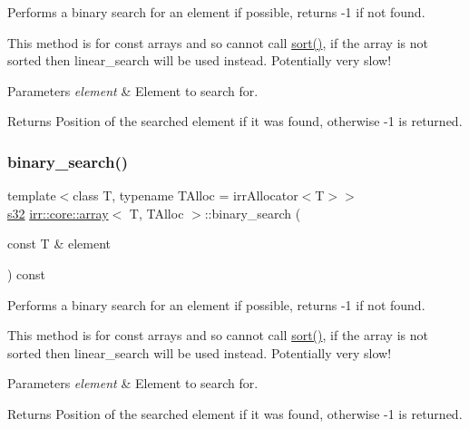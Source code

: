 Performs a binary search for an element if possible, returns -\/1 if not found. 

This method is for const arrays and so cannot call \hyperlink{classirr_1_1core_1_1array_a870e52dd57dd67a9d59e5ca5f82bca94}{sort()}, if the array is not sorted then linear\+\_\+search will be used instead. Potentially very slow! 
\begin{DoxyParams}{Parameters}
{\em element} & Element to search for. \\
\hline
\end{DoxyParams}
\begin{DoxyReturn}{Returns}
Position of the searched element if it was found, otherwise -\/1 is returned. 
\end{DoxyReturn}
\mbox{\label{classirr_1_1core_1_1array_aec40f807c683671067d52e83d7b72a82}} 
\subsubsection{\texorpdfstring{binary\+\_\+search()}{binary\_search()}\hspace{0.1cm}{\footnotesize\ttfamily [4/6]}}
{\footnotesize\ttfamily template$<$class T, typename T\+Alloc = irr\+Allocator$<$\+T$>$$>$ \\
\hyperlink{namespaceirr_ac66849b7a6ed16e30ebede579f9b47c6}{s32} \hyperlink{classirr_1_1core_1_1array}{irr\+::core\+::array}$<$ T, T\+Alloc $>$\+::binary\+\_\+search (\begin{DoxyParamCaption}\item[{const T \&}]{element }\end{DoxyParamCaption}) const\hspace{0.3cm}{\ttfamily [inline]}}



Performs a binary search for an element if possible, returns -\/1 if not found. 

This method is for const arrays and so cannot call \hyperlink{classirr_1_1core_1_1array_a870e52dd57dd67a9d59e5ca5f82bca94}{sort()}, if the array is not sorted then linear\+\_\+search will be used instead. Potentially very slow! 
\begin{DoxyParams}{Parameters}
{\em element} & Element to search for. \\
\hline
\end{DoxyParams}
\begin{DoxyReturn}{Returns}
Position of the searched element if it was found, otherwise -\/1 is returned. 
\end{DoxyReturn}
\mbox{\label{classirr_1_1core_1_1array_a9f3d6ee26c52d2e231446e4069a765a3}} 
